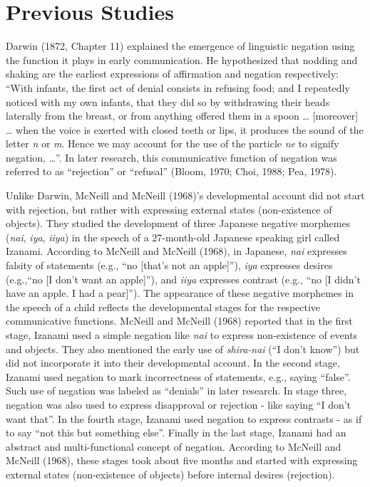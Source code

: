 \documentclass[
  man,floatsintext]{apa6}
\begin{document}
\hypertarget{previous-studies}{%
\section{Previous Studies}\label{previous-studies}}

Darwin (1872, Chapter 11) explained the emergence of linguistic negation using the function it plays in early communication. He hypothesized that nodding and shaking are the earliest expressions of affirmation and negation respectively: ``With infants, the first act of denial consists in refusing food; and I repeatedly noticed with my own infants, that they did so by withdrawing their heads laterally from the breast, or from anything offered them in a spoon \ldots{} {[}moreover{]} \ldots{} when the voice is exerted with closed teeth or lips, it produces the sound of the letter \emph{n} or \emph{m}. Hence we may account for the use of the particle \emph{ne} to signify negation, \ldots{}''. In later research, this communicative function of negation was referred to as ``rejection'' or ``refusal'' (Bloom, 1970; Choi, 1988; Pea, 1978).

Unlike Darwin, McNeill and McNeill (1968)'s developmental account did not start with rejection, but rather with expressing external states (non-existence of objects). They studied the development of three Japanese negative morphemes (\emph{nai}, \emph{iya}, \emph{iiya}) in the speech of a 27-month-old Japanese speaking girl called Izanami. According to McNeill and McNeill (1968), in Japanese, \emph{nai} expresses falsity of statements (e.g., ``no {[}that's not an apple{]}''), \emph{iya} expresses desires (e.g.,``no {[}I don't want an apple{]}''), and \emph{iiya} expresses contrast (e.g., ``no {[}I didn't have an apple. I had a pear{]}''). The appearance of these negative morphemes in the speech of a child reflects the developmental stages for the respective communicative functions. McNeill and McNeill (1968) reported that in the first stage, Izanami used a simple negation like \emph{nai} to express non-existence of events and objects. They also mentioned the early use of \emph{shira-nai} (``I don't know'') but did not incorporate it into their developmental account. In the second stage, Izanami used negation to mark incorrectness of statements, e.g., saying ``false''. Such use of negation was labeled as ``denials'' in later research. In stage three, negation was also used to express disapproval or rejection - like saying ``I don't want that''. In the fourth stage, Izanami used negation to express contrasts - as if to say ``not this but something else''. Finally in the last stage, Izanami had an abstract and multi-functional concept of negation. According to McNeill and McNeill (1968), these stages took about five months and started with expressing external states (non-existence of objects) before internal desires (rejection).
\end{document}
